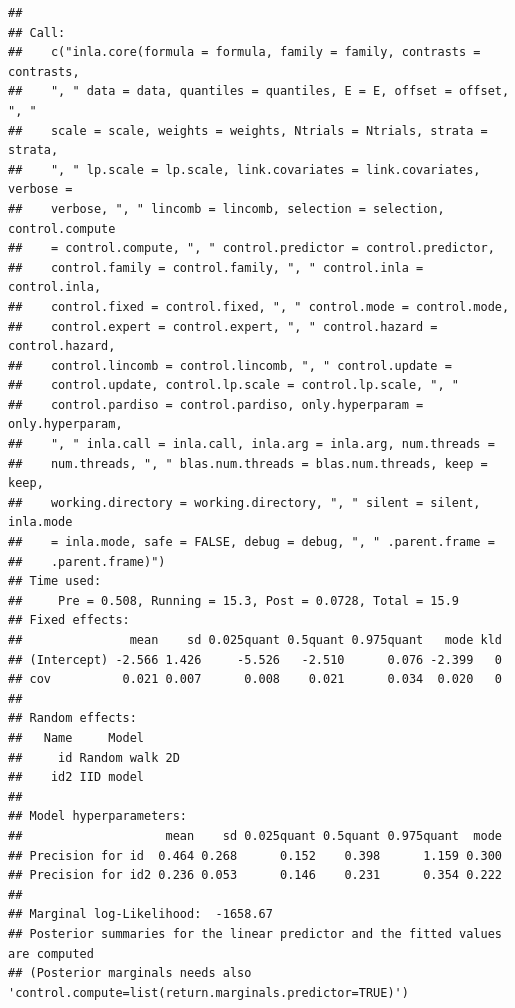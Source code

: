\documentclass[
]{article}
\begin{document}
\begin{verbatim}
## 
## Call:
##    c("inla.core(formula = formula, family = family, contrasts = contrasts, 
##    ", " data = data, quantiles = quantiles, E = E, offset = offset, ", " 
##    scale = scale, weights = weights, Ntrials = Ntrials, strata = strata, 
##    ", " lp.scale = lp.scale, link.covariates = link.covariates, verbose = 
##    verbose, ", " lincomb = lincomb, selection = selection, control.compute 
##    = control.compute, ", " control.predictor = control.predictor, 
##    control.family = control.family, ", " control.inla = control.inla, 
##    control.fixed = control.fixed, ", " control.mode = control.mode, 
##    control.expert = control.expert, ", " control.hazard = control.hazard, 
##    control.lincomb = control.lincomb, ", " control.update = 
##    control.update, control.lp.scale = control.lp.scale, ", " 
##    control.pardiso = control.pardiso, only.hyperparam = only.hyperparam, 
##    ", " inla.call = inla.call, inla.arg = inla.arg, num.threads = 
##    num.threads, ", " blas.num.threads = blas.num.threads, keep = keep, 
##    working.directory = working.directory, ", " silent = silent, inla.mode 
##    = inla.mode, safe = FALSE, debug = debug, ", " .parent.frame = 
##    .parent.frame)") 
## Time used:
##     Pre = 0.508, Running = 15.3, Post = 0.0728, Total = 15.9 
## Fixed effects:
##               mean    sd 0.025quant 0.5quant 0.975quant   mode kld
## (Intercept) -2.566 1.426     -5.526   -2.510      0.076 -2.399   0
## cov          0.021 0.007      0.008    0.021      0.034  0.020   0
## 
## Random effects:
##   Name     Model
##     id Random walk 2D
##    id2 IID model
## 
## Model hyperparameters:
##                    mean    sd 0.025quant 0.5quant 0.975quant  mode
## Precision for id  0.464 0.268      0.152    0.398      1.159 0.300
## Precision for id2 0.236 0.053      0.146    0.231      0.354 0.222
## 
## Marginal log-Likelihood:  -1658.67 
## Posterior summaries for the linear predictor and the fitted values are computed
## (Posterior marginals needs also 'control.compute=list(return.marginals.predictor=TRUE)')
\end{verbatim}
\end{document}
